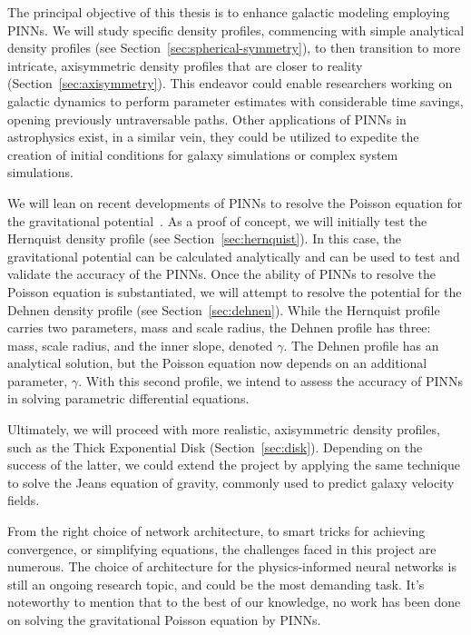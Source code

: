 The principal objective of this thesis is to enhance galactic modeling employing PINNs. We will study specific density profiles, commencing with simple analytical density profiles (see Section~\ref{sec:spherical-symmetry}), to then transition to more intricate, axisymmetric density profiles that are closer to reality (Section~\ref{sec:axisymmetry}). This endeavor could enable researchers working on galactic dynamics to perform parameter estimates with considerable time savings, opening previously untraversable paths. Other applications of PINNs in astrophysics exist, in a similar vein, they could be utilized to expedite the creation of initial conditions for galaxy simulations or complex system simulations.

We will lean on recent developments of PINNs to resolve the Poisson equation for the gravitational potential~\cite{kharazmi_variational_2019}. As a proof of concept, we will initially test the Hernquist density profile (see Section~\ref{sec:hernquist}). In this case, the gravitational potential can be calculated analytically and can be used to test and validate the accuracy of the PINNs. Once the ability of PINNs to resolve the Poisson equation is substantiated, we will attempt to resolve the potential for the Dehnen density profile (see Section~\ref{sec:dehnen}). While the Hernquist profile carries two parameters, mass and scale radius, the Dehnen profile has three: mass, scale radius, and the inner slope, denoted $\gamma$. The Dehnen profile has an analytical solution, but the Poisson equation now depends on an additional parameter, $\gamma$. With this second profile, we intend to assess the accuracy of PINNs in solving parametric differential equations.

Ultimately, we will proceed with more realistic, axisymmetric density profiles, such as the Thick Exponential Disk (Section~\ref{sec:disk}). Depending on the success of the latter, we could extend the project by applying the same technique to solve the Jeans equation of gravity, commonly used to predict galaxy velocity fields.

From the right choice of network architecture, to smart tricks for achieving convergence, or simplifying equations, the challenges faced in this project are numerous. The choice of architecture for the physics-informed neural networks is still an ongoing research topic, and could be the most demanding task. It's noteworthy to mention that to the best of our knowledge, no work has been done on solving the gravitational Poisson equation by PINNs.

